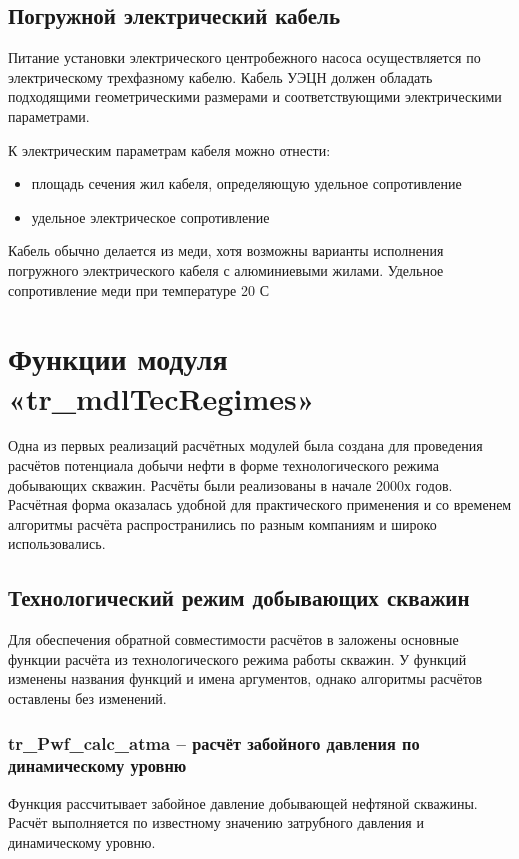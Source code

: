 \documentclass[]{scrreprt}
\begin{document}
\section{Погружной электрический кабель}
Питание установки электрического центробежного насоса осуществляется по электрическому трехфазному кабелю. Кабель УЭЦН должен обладать подходящими геометрическими размерами и соответствующими электрическими параметрами.

К электрическим параметрам кабеля можно отнести:
\begin{itemize}
	\item площадь сечения жил кабеля, определяющую удельное сопротивление
	\item удельное электрическое сопротивление
\end{itemize}

Кабель обычно делается из меди, хотя возможны варианты исполнения погружного электрического кабеля с алюминиевыми жилами. 
Удельное сопротивление меди при температуре 20  \textdegree С

\newpage
\chapter{Функции модуля  «tr\_mdlTecRegimes»}
Одна из первых реализаций расчётных модулей \unf была создана для проведения расчётов потенциала добычи нефти в форме технологического режима добывающих скважин. Расчёты были реализованы в начале 2000х годов. Расчётная форма оказалась удобной для практического применения и со временем алгоритмы расчёта распространились по разным компаниям и широко использовались.
\section{Технологический режим добывающих скважин}

 

Для обеспечения обратной совместимости расчётов в \unf заложены основные функции расчёта из технологического режима работы скважин. У функций изменены названия функций и имена аргументов, однако алгоритмы расчётов оставлены без изменений.

\newpage
\subsection{tr\_Pwf\_calc\_atma – расчёт забойного давления по динамическому уровню}

Функция рассчитывает забойное давление добывающей нефтяной скважины. Расчёт выполняется по известному значению затрубного давления и динамическому уровню. \cite{Khasanov_TR_2006}
\end{document}
